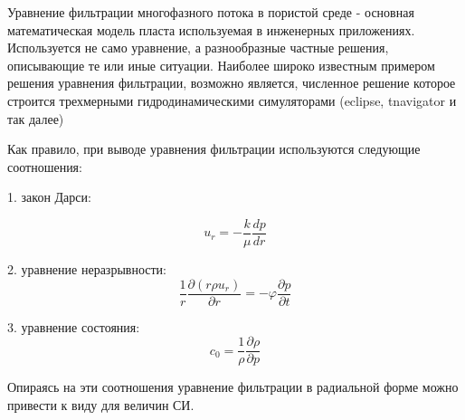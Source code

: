 
Уравнение фильтрации многофазного потока в пористой среде - основная математическая модель пласта используемая в инженерных приложениях. Используется не само уравнение, а разнообразные частные решения, описывающие те или иные ситуации. Наиболее широко известным примером решения уравнения фильтрации, возможно является, численное решение которое строится трехмерными гидродинамическими симуляторами (eclipse, tnavigator и так далее)


Как правило, при выводе уравнения фильтрации используются следующие соотношения:

1. закон Дарси:  

\begin{equation} \label{eq:darcy_law_1}
	u_r=-\frac{k}{\mu}\frac{dp}{dr} 
\end{equation}


2. уравнение неразрывности: 
\begin{equation} \label{eq:mass_balance_1} 
	\frac{1}{r}\frac{\partial\left(r\rho u_r\right)}{\partial r}=-\varphi\frac{\partial p}{\partial t} 
\end{equation}

3. уравнение состояния: 
\begin{equation} \label{eq:eos_1} 
	c_0=\frac{1}{\rho}\frac{\partial\rho}{\partial p} 
\end{equation}

Опираясь на эти соотношения уравнение фильтрации в радиальной форме можно привести к виду для величин СИ.

